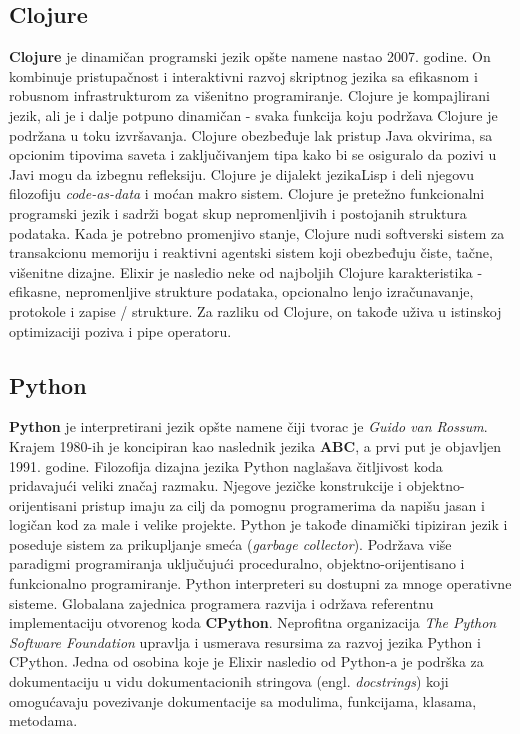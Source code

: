 \documentclass[12pt,oneside]{memoir}
\begin{document}
\subsection{Clojure}
\textbf{Clojure} je dinamičan programski jezik opšte namene nastao 2007. godine. On kombinuje pristupačnost i interaktivni razvoj skriptnog jezika sa efikasnom i robusnom infrastrukturom za višenitno programiranje. Clojure je kompajlirani jezik, ali je i dalje potpuno dinamičan - svaka funkcija koju podržava Clojure je podržana u toku izvršavanja. Clojure obezbeđuje lak pristup Java okvirima, sa opcionim tipovima saveta i zaključivanjem tipa kako bi se osiguralo da pozivi u Javi mogu da izbegnu refleksiju.
Clojure je dijalekt jezikaLisp i deli njegovu filozofiju \textit{code-as-data} i moćan makro sistem. Clojure je pretežno funkcionalni programski jezik i sadrži bogat skup nepromenljivih i postojanih struktura podataka. Kada je potrebno promenjivo stanje, Clojure nudi softverski sistem za transakcionu memoriju i reaktivni agentski sistem koji obezbeđuju čiste, tačne, višenitne dizajne. Elixir je nasledio neke od najboljih Clojure karakteristika - efikasne, nepromenljive strukture podataka, opcionalno lenjo izračunavanje, protokole i zapise / strukture. Za razliku od Clojure, on takođe uživa u istinskoj optimizaciji poziva i pipe operatoru. 

\newpage

\subsection{Python}
\textbf{Python} je interpretirani jezik opšte namene čiji tvorac je \textit{Guido van Rossum}. Krajem 1980-ih je koncipiran kao naslednik jezika \textbf{ABC}, a prvi put je objavljen 1991. godine. Filozofija dizajna jezika Python naglašava čitljivost koda pridavajući veliki značaj razmaku. Njegove jezičke konstrukcije i objektno-orijentisani pristup imaju za cilj da pomognu programerima da napišu jasan i logičan kod za male i velike projekte. Python je takođe dinamički tipiziran jezik i poseduje sistem za prikupljanje smeća (\textit{garbage collector}). Podržava više paradigmi programiranja uključujući proceduralno, objektno-orijentisano i funkcionalno programiranje. Python interpreteri su dostupni za mnoge operativne sisteme. Globalana zajednica programera razvija i održava referentnu implementaciju otvorenog koda \textbf{CPython}. Neprofitna organizacija \textit{The Python Software Foundation} upravlja i usmerava resursima za razvoj jezika Python i CPython. Jedna od osobina koje je Elixir nasledio od Python-a je podrška za dokumentaciju u vidu dokumentacionih stringova (engl. \textit{docstrings}) koji omogućavaju povezivanje dokumentacije sa modulima, funkcijama, klasama, metodama.
\end{document}
